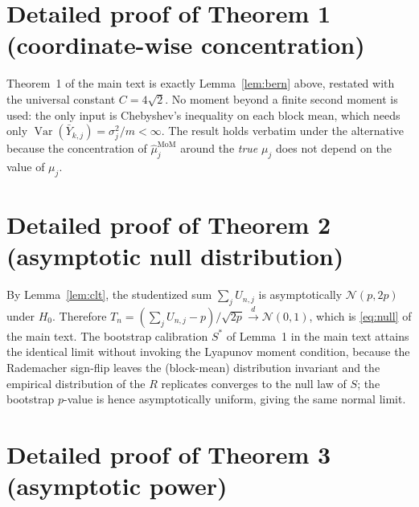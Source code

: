 \documentclass[11pt]{article}
\newcommand{\Var}{\operatorname{Var}}
\theoremstyle{plain}
\theoremstyle{definition}
\begin{document}
\section{Detailed proof of Theorem 1 (coordinate-wise concentration)}
\label{sec:proofT1}

Theorem~1 of the main text is exactly Lemma~\ref{lem:bern} above, restated with
the universal constant $C=4\sqrt{2}$. No moment beyond a finite second moment is
used: the only input is Chebyshev's inequality on each block mean, which needs
only $\Var(\bar Y_{k,j})=\sigma_j^2/m<\infty$. The result holds verbatim under
the alternative because the concentration of $\hat\mu^{\mathrm{MoM}}_j$ around
the \emph{true} $\mu_j$ does not depend on the value of $\mu_j$.

\section{Detailed proof of Theorem 2 (asymptotic null distribution)}
\label{sec:proofT2}

By Lemma~\ref{lem:clt}, the studentized sum
$\sum_j U_{n,j}$ is asymptotically $\mathcal{N}(p,2p)$ under $H_0$. Therefore
$T_n=(\sum_j U_{n,j}-p)/\sqrt{2p}\xrightarrow[]{d}\mathcal{N}(0,1)$, which is
\eqref{eq:null} of the main text. The bootstrap calibration
$S^{\ast}$ of Lemma~1 in the main text attains the identical limit without
invoking the Lyapunov moment condition, because the Rademacher sign-flip leaves
the (block-mean) distribution invariant and the empirical distribution of the
$R$ replicates converges to the null law of $S$; the bootstrap $p$-value is
hence asymptotically uniform, giving the same normal limit.

\section{Detailed proof of Theorem 3 (asymptotic power)}
\label{sec:proofT3}
\end{document}
